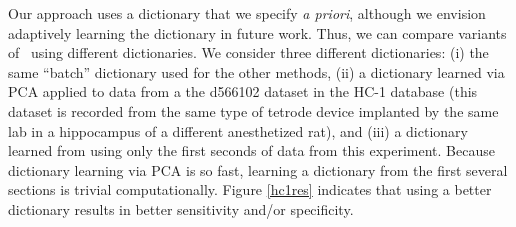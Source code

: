 Our approach uses a dictionary that we specify \emph{a priori}, although we envision adaptively learning the dictionary in future work. Thus, we can compare variants of \smug~using different dictionaries.  We consider three different dictionaries: (i) the same ``batch'' dictionary used for the other methods, (ii) a dictionary learned via PCA applied to data from a the d566102 dataset in the HC-1 database (this dataset is recorded from the same type of tetrode device implanted by the same lab in a hippocampus of a different anesthetized rat), and (iii) a dictionary learned from using only the first  seconds of data from this experiment.  Because dictionary learning via PCA is so fast, learning a dictionary from the first several sections is trivial computationally.  Figure \ref{hc1res} indicates that using a better dictionary results in better sensitivity and/or specificity. 



